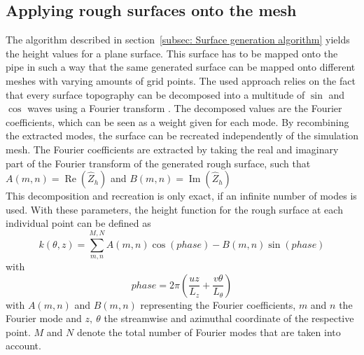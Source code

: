 \subsection{Applying rough surfaces onto the mesh}\label{subsec: Generating rough mesh}
The algorithm described in section~\ref{subsec: Surface generation algorithm} yields the height values for a plane surface.
This surface has to be mapped onto the pipe in such a way that the same generated surface can be mapped onto different meshes with varying amounts of grid points.
The used approach relies on the fact that every surface topography can be decomposed into a multitude of $\sin$ and $\cos$ waves using a Fourier transform \citep{perez-rafolsGeneratingRandomlyRough2019}.
The decomposed values are the Fourier coefficients, which can be seen as a weight given for each mode.
By recombining the extracted modes, the surface can be recreated independently of the simulation mesh.
The Fourier coefficients are extracted by taking the real and imaginary part  of the Fourier transform of the generated rough surface, such that $A(m,n) = \operatorname{Re}\left(\hat{Z}_h\right)$ and $B(m,n) = \operatorname{Im}\left(\hat{Z}_h\right)$\\
This decomposition and recreation is only exact, if an infinite number of modes is used.
With these parameters, the height function for the rough surface at each individual point can be defined as
\begin{equation}\label{eq: height function}
    k(\theta,z) = \sum_{m,n}^{M,N} A(m,n)\cos(phase)- B(m,n)\sin(phase)
\end{equation}
with
\begin{equation}\label{eq: phase equation}
    phase = 2\pi\left(\frac{uz}{L_z} + \frac{v\theta}{L_{\theta}}\right)
\end{equation}
with $A(m,n)$ and $B(m,n)$ representing the Fourier coefficients, $m$ and $n$ the Fourier mode and $z,\ \theta$ the streamwise and azimuthal coordinate of the respective point.
$M$ and $N$ denote the total number of Fourier modes that are taken into account.
